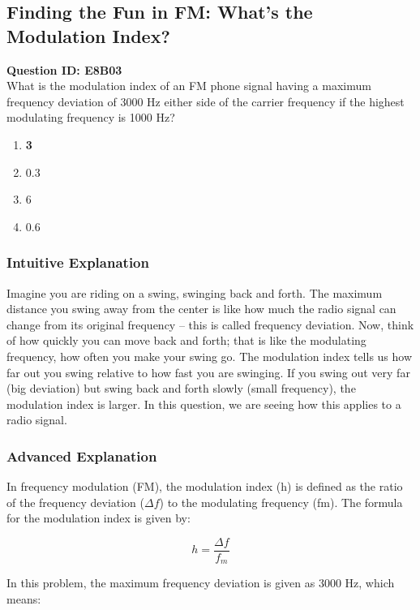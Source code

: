 \subsection{Finding the Fun in FM: What's the Modulation Index?}

\begin{tcolorbox}
    \textbf{Question ID: E8B03} \\
    What is the modulation index of an FM phone signal having a maximum frequency deviation of 3000 Hz either side of the carrier frequency if the highest modulating frequency is 1000 Hz? \\

    \begin{enumerate}[label=\Alph*.]
        \item \textbf{3}
        \item 0.3
        \item 6
        \item 0.6
    \end{enumerate}
\end{tcolorbox}

\subsubsection{Intuitive Explanation}
Imagine you are riding on a swing, swinging back and forth. The maximum distance you swing away from the center is like how much the radio signal can change from its original frequency – this is called frequency deviation. Now, think of how quickly you can move back and forth; that is like the modulating frequency, how often you make your swing go. The modulation index tells us how far out you swing relative to how fast you are swinging. If you swing out very far (big deviation) but swing back and forth slowly (small frequency), the modulation index is larger. In this question, we are seeing how this applies to a radio signal.

\subsubsection{Advanced Explanation}
In frequency modulation (FM), the modulation index (h) is defined as the ratio of the frequency deviation ($\Delta f$) to the modulating frequency (fm). The formula for the modulation index is given by:

\[
h = \frac{\Delta f}{f_m}
\]

In this problem, the maximum frequency deviation is given as 3000 Hz, which means:

